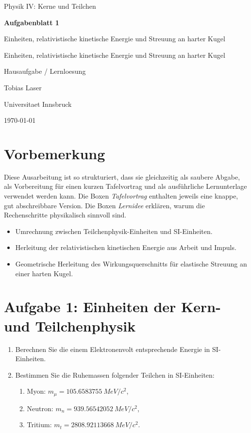 \documentclass[11pt,a4paper]{scrartcl}
\newcommand{\CourseTitle}{Physik IV: Kerne und Teilchen}
\newcommand{\DocumentKind}{Hausaufgabe / Lernloesung}
\newcommand{\DocumentTitle}{Aufgabenblatt 1}
\newcommand{\DocumentSubtitle}{Einheiten, relativistische kinetische Energie und Streuung an harter Kugel}
\newcommand{\AuthorName}{Tobias Laser}
\newcommand{\InstitutionName}{Universitaet Innsbruck}
\newcommand{\SubmissionDate}{\today}
\newcommand{\makeuniversitytitle}{%
    \begin{titlepage}
        \centering
        \vspace*{2cm}
        {\Large \CourseTitle\par}
        \vspace{1.2cm}
        {\huge\bfseries \DocumentTitle\par}
        \ifx\DocumentSubtitle\empty\else
            \vspace{0.4cm}
            {\Large \DocumentSubtitle\par}
        \fi
        \vspace{1cm}
        {\Large \DocumentKind\par}
        \vfill
        {\large \AuthorName\par}
        \vspace{0.2cm}
        {\large \InstitutionName\par}
        \vspace{0.8cm}
        {\large \SubmissionDate\par}
    \end{titlepage}
    \pagenumbering{arabic}
}
\newcommand{\MeV}{\si{MeV}}
\theoremstyle{definition}
\theoremstyle{plain}
\theoremstyle{remark}
\begin{document}
\makeuniversitytitle
\tableofcontents
\newpage

\section*{Vorbemerkung}
Diese Ausarbeitung ist so strukturiert, dass sie gleichzeitig als saubere Abgabe, als Vorbereitung für einen kurzen Tafelvortrag und als ausführliche Lernunterlage verwendet werden kann. Die Boxen \emph{Tafelvortrag} enthalten jeweils eine knappe, gut abschreibbare Version. Die Boxen \emph{Lernidee} erklären, warum die Rechenschritte physikalisch sinnvoll sind.

\begin{summarybox}[title=Zentrale Themen von Blatt 1]
\begin{itemize}
    \item Umrechnung zwischen Teilchenphysik-Einheiten und SI-Einheiten.
    \item Herleitung der relativistischen kinetischen Energie aus Arbeit und Impuls.
    \item Geometrische Herleitung des Wirkungsquerschnitts für elastische Streuung an einer harten Kugel.
\end{itemize}
\end{summarybox}

\newpage

\section{Aufgabe 1: Einheiten der Kern- und Teilchenphysik}

\begin{taskbox}
\begin{enumerate}[label=(\alph*)]
    \item Berechnen Sie die einem Elektronenvolt entsprechende Energie in SI-Einheiten.
    \item Bestimmen Sie die Ruhemassen folgender Teilchen in SI-Einheiten:
    \begin{enumerate}[label=(\roman*)]
        \item Myon: $m_\mu = \SI{105.6583755}{\MeV}/c^2$,
        \item Neutron: $m_n = \SI{939.56542052}{\MeV}/c^2$,
        \item Tritium: $m_t = \SI{2808.92113668}{\MeV}/c^2$.
    \end{enumerate}
\end{enumerate}
\end{taskbox}
\end{document}
